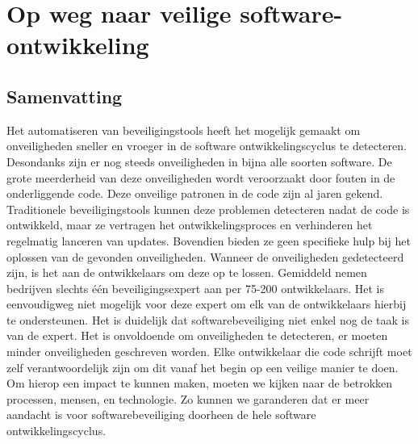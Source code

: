 \chapter*{Op weg naar veilige software-ontwikkeling}
\section*{Samenvatting}

Het automatiseren van beveiligingstools heeft het mogelijk gemaakt om onveiligheden sneller en vroeger in de software ontwikkelingscyclus te detecteren.
Desondanks zijn er nog steeds onveiligheden in bijna alle soorten software.
De grote meerderheid van deze onveiligheden wordt veroorzaakt door fouten in de onderliggende code.
Deze onveilige patronen in de code zijn al jaren gekend.
Traditionele beveiligingstools kunnen deze problemen detecteren nadat de code is ontwikkeld, maar ze vertragen het ontwikkelingsproces en verhinderen het regelmatig lanceren van updates.
Bovendien bieden ze geen specifieke hulp bij het oplossen van de gevonden onveiligheden.
Wanneer de onveiligheden gedetecteerd zijn, is het aan de ontwikkelaars om deze op te lossen.
Gemiddeld nemen bedrijven slechts één beveiligingsexpert aan per 75-200 ontwikkelaars.
Het is eenvoudigweg niet mogelijk voor deze expert om elk van de ontwikkelaars hierbij te ondersteunen.
Het is duidelijk dat softwarebeveiliging niet enkel nog de taak is van de expert.
Het is onvoldoende om onveiligheden te detecteren, er moeten minder onveiligheden geschreven worden.
Elke ontwikkelaar die code schrijft moet zelf verantwoordelijk zijn om dit vanaf het begin op een veilige manier te doen.
Om hierop een impact te kunnen maken, moeten we kijken naar de betrokken processen, mensen, en technologie.
Zo kunnen we garanderen dat er meer aandacht is voor softwarebeveiliging doorheen de hele software ontwikkelingscyclus.


